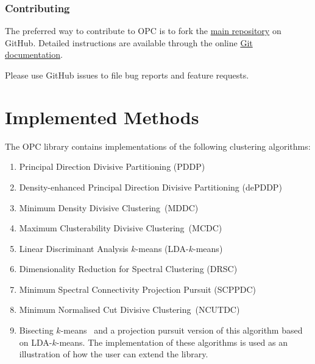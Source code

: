 \documentclass{book}
\begin{document}
\subsection{Contributing}

The preferred way to contribute to OPC is to fork the
\href{https://github.com/nicospavlidis/opc}{main repository} on GitHub.
Detailed instructions are available through the online
\href{https://git-scm.com/documentation}{Git documentation}.

Please use GitHub issues to file bug reports and feature requests. 


\chapter{Implemented Methods}

The OPC library contains implementations of the following clustering
algorithms:

\begin{enumerate}

\item Principal Direction Divisive Partitioning (PDDP)~\cite{Boley1998}

\item Density-enhanced Principal Direction Divisive Partitioning (dePDDP)~\cite{TasoulisTP2010}

\item Minimum Density Divisive Clustering~(MDDC)~\cite{PavlidisHT2016}

\item Maximum Clusterability Divisive Clustering~(MCDC)~\cite{HofmeyrP2015}

\item Linear Discriminant Analysis $k$-means (LDA-$k$-means)~\cite{DingL2007}

\item Dimensionality Reduction for Spectral Clustering (DRSC)~\cite{NiuDJ2011,NiuDJ2014}

\item Minimum Spectral Connectivity Projection Pursuit (SCPPDC)~\cite{HofmeyrPE2018}

\item Minimum Normalised Cut Divisive Clustering~(NCUTDC)~\cite{Hofmeyr2017}

\item Bisecting $k$-means~\cite{SteinbachKK2000} and a projection pursuit
version of this algorithm based on LDA-$k$-means.
The implementation of these
algorithms is used as an illustration of how the user can extend the library.

\end{enumerate}
\end{document}
